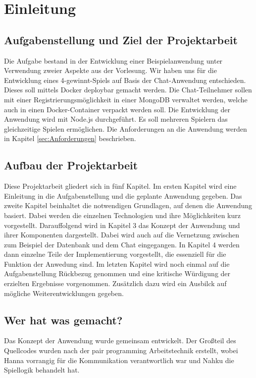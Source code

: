 
\chapter{Einleitung}\label{cha:Einleitung}

\section{Aufgabenstellung und Ziel der Projektarbeit}\label{sec:Aufgabenstellung}
Die Aufgabe bestand in der Entwicklung einer Beispielanwendung unter Verwendung zweier Aspekte aus der Vorlesung. Wir haben uns für die Entwicklung eines 4-gewinnt-Spiels auf Basis der Chat-Anwendung entschieden. Dieses soll mittels Docker deploybar gemacht werden. Die Chat-Teilnehmer sollen mit einer Registrierungsmöglichkeit in einer MongoDB verwaltet werden, welche auch in einen Docker-Container verpackt werden soll. Die Entwicklung der Anwendung wird mit Node.js durchgeführt. Es soll mehreren Spielern das gleichzeitige Spielen ermöglichen. Die Anforderungen an die Anwendung werden in Kapitel \ref{sec:Anforderungen} beschrieben.
\section{Aufbau der Projektarbeit}\label{sec:Aufbau}
Diese Projektarbeit gliedert sich in fünf Kapitel. Im ersten Kapitel wird eine Einleitung in die Aufgabenstellung und die geplante Anwendung gegeben. Das zweite Kapitel beinhaltet die notwendigen Grundlagen, auf denen die Anwendung basiert. Dabei werden die einzelnen Technologien und ihre Möglichkeiten kurz vorgestellt. Darauffolgend wird in Kapitel 3 das Konzept der Anwendung und ihrer Komponenten dargestellt. Dabei wird auch auf die Vernetzung zwischen zum Beispiel der Datenbank und dem Chat eingegangen. In Kapitel 4 werden dann einzelne Teile der Implementierung vorgestellt, die essenziell für die Funktion der Anwedung sind. Im letzten Kapitel wird noch einmal auf die Aufgabenstellung Rückbezug genommen und eine kritische Würdigung der erzielten Ergebnisse vorgenommen. Zusätzlich dazu wird ein Ausbilck auf mögliche Weiterentwicklungen gegeben.
\section{Wer hat was gemacht?}\label{sec:Aufteilung}
Das Konzept der Anwendung wurde gemeinsam entwickelt. Der Großteil des Quellcodes wurden nach der pair programming Arbeitstechnik erstellt, wobei Hanna vorrangig für die Kommunikation verantwortlich war und Nahku die Spiellogik behandelt hat.